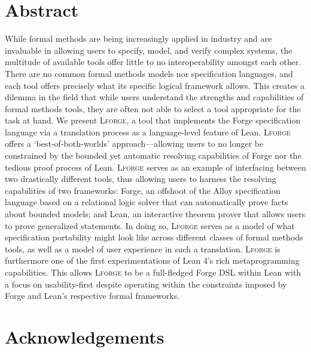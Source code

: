 \newpage
\section*{Abstract}
While formal methods are being increasingly applied in industry and are invaluable in allowing users to specify, model, and verify complex systems, the multitude of available tools offer little to no interoperability amongst each other. 
There are no common formal methods models nor specification languages, and each tool offers precisely what its specific logical framework allows. 
This creates a dilemma in the field that while users understand the strengths and capabilities of formal methods tools, they are often not able to select a tool appropriate for the task at hand. 
We present \textsc{Lforge}, a tool that implements the Forge specification language via a translation process as a language-level feature of Lean. 
\textsc{Lforge} offers a `best-of-both-worlds' approach---allowing users to no longer be constrained by the bounded yet automatic resolving capabilities of Forge nor the tedious proof process of Lean.
\textsc{Lforge} serves as an example of interfacing between two drastically different tools, thus allowing users to harness the resolving capabilities of two frameworks: Forge, an offshoot of the Alloy specification language based on a relational logic solver that can automatically prove facts about bounded models; and Lean, an interactive theorem prover that allows users to prove generalized statements. 
In doing so, \textsc{Lforge} serves as a model of what specification portability might look like across different classes of formal methods tools, as well as a model of user experience in such a translation. 
\textsc{Lforge} is furthermore one of the first experimentations of Lean 4's rich metaprogramming capabilities. This allows \textsc{Lforge} to be a full-fledged Forge DSL within Lean with a focus on usability-first despite operating within the constraints imposed by Forge and Lean's respective formal frameworks. 

\newpage
\section*{Acknowledgements}


